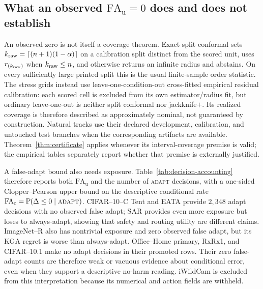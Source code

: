 \subsection{What an observed $\mathrm{FA}_{\mathrm u}=0$ does and does not establish}\label{sec:fa-identity}
An observed zero is not itself a coverage theorem. Exact split conformal sets
$k_{\rm raw}=\lceil(n+1)(1-\alpha)\rceil$ on a calibration split distinct from the scored unit,
uses $r_{(k_{\rm raw})}$ when $k_{\rm raw}\le n$, and otherwise returns an infinite radius and
abstains. On every sufficiently large printed split this is the usual finite-sample order statistic. The
stress grids instead use leave-one-condition-out cross-fitted empirical residual calibration: each
scored cell is excluded from its own estimator/radius fit, but ordinary leave-one-out is neither
split conformal nor jackknife$+$. Its realized coverage is therefore described as approximately
nominal, not guaranteed by construction. Natural tracks use their declared development,
calibration, and untouched test branches when the corresponding artifacts are available.
Theorem~\ref{thm:certificate} applies whenever its interval-coverage premise is valid; the empirical
tables separately report whether that premise is externally justified.

A false-adapt bound also needs exposure. Table~\ref{tab:decision-accounting} therefore reports both
$\mathrm{FA}_{\mathrm u}$ and the number of \textsc{adapt} decisions, with a one-sided
Clopper--Pearson upper bound on the descriptive conditional rate
$\mathrm{FA}_{\mathrm c}=\Pr(\Delta\le0\mid\textsc{adapt})$. CIFAR--10--C Tent and EATA provide
$2{,}348$ adapt decisions with no observed false adapt; SAR provides even more exposure but loses to
always-adapt, showing that safety and routing utility are different claims. ImageNet--R also has
nontrivial exposure and zero observed false adapt, but its KGA regret is worse than always-adapt.
Office--Home primary, RxRx1, and CIFAR--10.1 make no adapt decisions in
their promoted rows. Their zero false-adapt counts are therefore weak or vacuous evidence about
conditional error, even when they support a descriptive no-harm reading.
iWildCam is excluded from this interpretation because its numerical and action fields are withheld.

